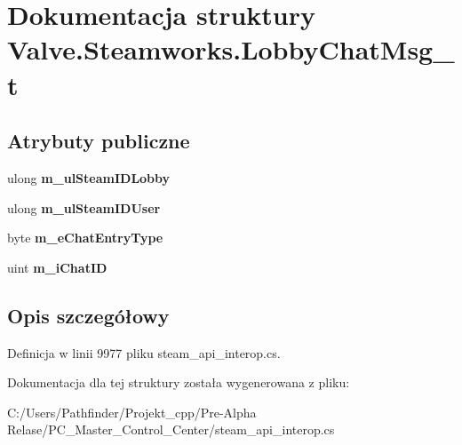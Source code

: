 \hypertarget{struct_valve_1_1_steamworks_1_1_lobby_chat_msg__t}{}\section{Dokumentacja struktury Valve.\+Steamworks.\+Lobby\+Chat\+Msg\+\_\+t}
\label{struct_valve_1_1_steamworks_1_1_lobby_chat_msg__t}
\subsection*{Atrybuty publiczne}
\begin{DoxyCompactItemize}
\item 
\mbox{\label{struct_valve_1_1_steamworks_1_1_lobby_chat_msg__t_ad1a642d16cc0ec2cd99cf8ad63ecf65a}} 
ulong {\bfseries m\+\_\+ul\+Steam\+I\+D\+Lobby}
\item 
\mbox{\label{struct_valve_1_1_steamworks_1_1_lobby_chat_msg__t_a40aad7eb0f11ec877a0ec9448df73960}} 
ulong {\bfseries m\+\_\+ul\+Steam\+I\+D\+User}
\item 
\mbox{\label{struct_valve_1_1_steamworks_1_1_lobby_chat_msg__t_a9f2f810bac5672e03368a265de2afc18}} 
byte {\bfseries m\+\_\+e\+Chat\+Entry\+Type}
\item 
\mbox{\label{struct_valve_1_1_steamworks_1_1_lobby_chat_msg__t_a8a7a47e34940cd9836e6354bb591002d}} 
uint {\bfseries m\+\_\+i\+Chat\+ID}
\end{DoxyCompactItemize}


\subsection{Opis szczegółowy}


Definicja w linii 9977 pliku steam\+\_\+api\+\_\+interop.\+cs.



Dokumentacja dla tej struktury została wygenerowana z pliku\+:\begin{DoxyCompactItemize}
\item 
C\+:/\+Users/\+Pathfinder/\+Projekt\+\_\+cpp/\+Pre-\/\+Alpha Relase/\+P\+C\+\_\+\+Master\+\_\+\+Control\+\_\+\+Center/steam\+\_\+api\+\_\+interop.\+cs\end{DoxyCompactItemize}
